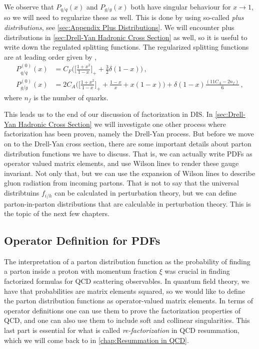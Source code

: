 We observe that $P_{q/q}(x)$ and $P_{g/g}(x)$ both have singular behaviour for $x\rightarrow 1$, so we will need to regularize these as well. This is done by using so-called \emph{plus distributions}, see \cref{sec:Appendix Plus Distributions}. We will encounter plus distributions in \cref{sec:Drell-Yan Hadronic Cross Section} as well, so it is useful to write down the regulated splitting functions. The regularized splitting functions are at leading order given by \cite{Altarelli:1977zs},
\begin{align}
    P_{q/q}^{(0)}(x)&=C_{F}\Big(\Big[\frac{1+x^{2}}{1-x}\Big]_{+}+\frac{3}{2}\delta(1-x)\Big)\,,\label{eq:qq splitting function}
    \\
    P_{g/g}^{(0)}(x)&=2C_{A}\Big(\Big[\frac{1+x^{2}}{1-x}\Big]_{+}+\frac{1-x}{x}+x(1-x)\Big)+\delta(1-x)\frac{(11C_{A}-2n_{f})}{6}\,,\label{eq:gg splitting function}
\end{align}
where $n_{f}$ is the number of quarks. 

This leads us to the end of our discussion of factorization in DIS. In \cref{sec:Drell-Yan Hadronic Cross Section} we will investigate one other process where factorization has been proven, namely the Drell-Yan process. But before we move on to the Drell-Yan cross section, there are some important details about parton distribution functions we have to discuss. That is, we can actually write PDFs as operator valued matrix elements, and use Wilson lines to render these gauge invariant. Not only that, but we can use the expansion of Wilson lines to describe gluon radiation from incoming partons. That is not to say that the universal distribtuins $f_{i/h}$ can be calculated in perturbation theory, but we can define parton-in-parton distributions that are calculable in perturbation theory. This is the topic of the next few chapters.

\subsection{Operator Definition for PDFs}\label{sec:Operator definition for Parton Distributions}
 

The interpretation of a parton distribution function as the probability of
finding a parton inside a proton with momentum fraction $\xi$ was
crucial in finding factorized formulas for QCD scattering observables. In quantum field
theory, we have that probabilities are matrix elements squared, so we would like to define the parton distribution functions as operator-valued matrix elements. In terms of operator definitions one can use them to prove the factorization properties of QCD, and one can also use them to include soft and collinear singularities. This last part is essential for what is called \emph{re-factorization} in QCD resummation, which we will come back to in \cref{chap:Resummation in QCD}. 

